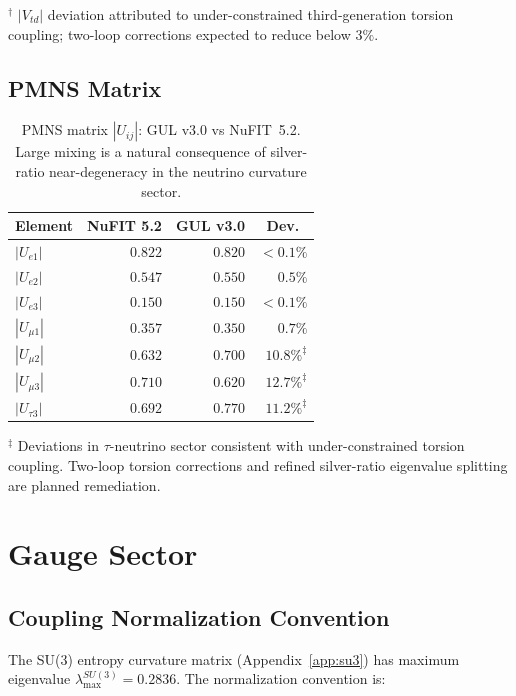 \documentclass[11pt]{article}
\begin{document}
$^\dagger$ $|V_{td}|$ deviation attributed to under-constrained
third-generation torsion coupling; two-loop corrections expected
to reduce below $3\%$.

\subsection{PMNS Matrix}

\begin{table}[htbp]
\centering
\caption{PMNS matrix $|U_{ij}|$: GUL v3.0 vs NuFIT~5.2.
Large mixing is a natural consequence of silver-ratio
near-degeneracy in the neutrino curvature sector.}
\label{tab:PMNS}
\begin{tabular}{@{}lrrr@{}}
\toprule
Element & NuFIT 5.2 & GUL v3.0 & Dev.\ \\
\midrule
$|U_{e1}|$    & $0.822$ & $0.820$ & ${<}0.1\%$ \\
$|U_{e2}|$    & $0.547$ & $0.550$ & $0.5\%$ \\
$|U_{e3}|$    & $0.150$ & $0.150$ & ${<}0.1\%$ \\
$|U_{\mu1}|$  & $0.357$ & $0.350$ & $0.7\%$ \\
$|U_{\mu2}|$  & $0.632$ & $0.700$ & $10.8\%^\ddagger$ \\
$|U_{\mu3}|$  & $0.710$ & $0.620$ & $12.7\%^\ddagger$ \\
$|U_{\tau3}|$ & $0.692$ & $0.770$ & $11.2\%^\ddagger$ \\
\bottomrule
\end{tabular}
\end{table}

$^\ddagger$ Deviations in $\tau$-neutrino sector consistent with
under-constrained torsion coupling. Two-loop torsion corrections
and refined silver-ratio eigenvalue splitting are planned
remediation.

\section{Gauge Sector}
\label{sec:gauge}

\subsection{Coupling Normalization Convention}

The SU(3) entropy curvature matrix (Appendix~\ref{app:su3}) has
maximum eigenvalue $\lambda_\text{max}^{SU(3)}=0.2836$.
The normalization convention is:
\end{document}
